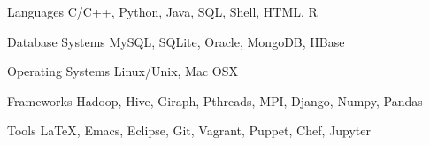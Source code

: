 

\begin{cvskills}

  \cvskill
    {Languages} %
    {C/C++, Python, Java, SQL, Shell, HTML, R} %

  \cvskill
    {Database Systems} %
    {MySQL, SQLite, Oracle, MongoDB, HBase} %

  \cvskill
    {Operating Systems} %
    {Linux/Unix, Mac OSX}

  \cvskill
    {Frameworks} %
    {Hadoop, Hive, Giraph, Pthreads, MPI, Django, Numpy, Pandas}

  \cvskill
    {Tools} %
    {LaTeX, Emacs, Eclipse, Git, Vagrant, Puppet, Chef, Jupyter} %

\end{cvskills}
